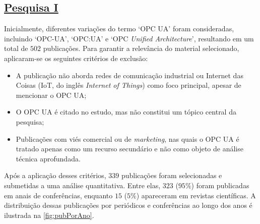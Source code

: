     \subsection*{\underline{Pesquisa I}}\label{subsec:pesqI}

    Inicialmente, diferentes variações do termo `OPC UA' foram consideradas, incluindo `OPC-UA', `OPC:UA' e `OPC \textit{Unified Architecture}', resultando em um total de $502$ publicações. Para garantir a relevância do material selecionado, aplicaram-se os seguintes critérios de exclusão:

    \begin{itemize}
        \item A publicação não aborda redes de comunicação industrial ou Internet das Coisas (IoT, do inglês \textit{Internet of Things}) como foco principal, apesar de mencionar o OPC UA;
        \item O OPC UA é citado no estudo, mas não constitui um tópico central da pesquisa;
        \item Publicações com viés comercial ou de \textit{marketing}, nas quais o OPC UA é tratado apenas como um recurso secundário e não como objeto de análise técnica aprofundada.
    \end{itemize}

    Após a aplicação desses critérios, $339$ publicações foram selecionadas e submetidas a uma análise quantitativa. Entre elas, $323$ ($95\%$) foram publicadas em anais de conferências, enquanto $15$ ($5\%$) apareceram em revistas científicas. A distribuição dessas publicações por periódicos e conferências ao longo dos anos é ilustrada na \autoref{fig:pubPorAno}.

    

